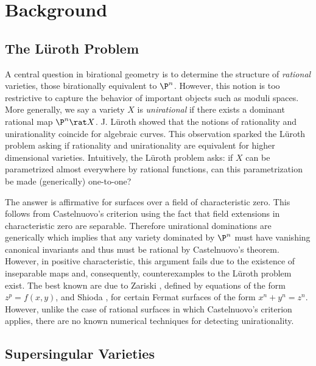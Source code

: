 \documentclass[10pt]{amsart}
\begin{document}
\thispagestyle{fancy}

\section*{Background}
\subsection*{The L\"{u}roth Problem}

A central question in birational geometry is to determine the structure of \textit{rational} varieties, those birationally equivalent to $\P^n$. However, this notion is too restrictive to capture the behavior of important objects such as moduli spaces. More generally, we say a variety $X$ is \textit{unirational} if there exists a dominant rational map $\P^n \rat X$. J. L\"{u}roth showed \cite{Luroth} that the notions of rationality and unirationality coincide for algebraic curves. This observation sparked the L\"{u}roth problem asking if rationality and unirationality are equivalent for higher dimensional varieties. Intuitively, the L\"{u}roth problem asks: if $X$ can be parametrized almost everywhere by rational functions, can this parametrization be made (generically) one-to-one? 
\par
The answer is affirmative for surfaces over a field of characteristic zero. This follows from Castelnuovo's criterion using the fact that field extensions in characteristic zero are separable. Therefore unirational dominations are generically \etale which implies that any variety dominated by $\P^n$ must have vanishing canonical invariants and thus must be rational by Castelnuovo's theorem. However, in positive characteristic, this argument fails due to the existence of inseparable maps and, consequently, counterexamples to the L\"{u}roth problem exist. The best known are due to Zariski \cite{zariski1958}, defined  by equations of the form $z^p = f(x, y)$, and Shioda \cite{shioda1974}, for certain Fermat surfaces of the form $x^n + y^n = z^n$. However, unlike the case of rational surfaces in which Castelnuovo's criterion applies, there are no known numerical techniques for detecting unirationality.

\subsection*{Supersingular Varieties}
\end{document}
